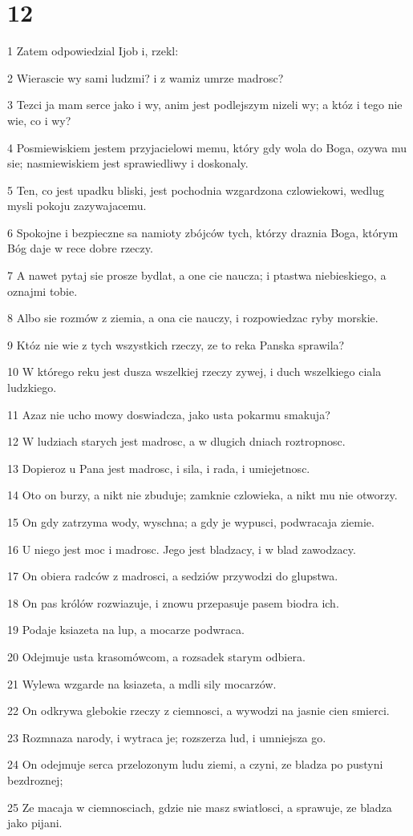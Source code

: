\chapter{12}

\par 1 Zatem odpowiedzial Ijob i, rzekl:
\par 2 Wierascie wy sami ludzmi? i z wamiz umrze madrosc?
\par 3 Tezci ja mam serce jako i wy, anim jest podlejszym nizeli wy; a któz i tego nie wie, co i wy?
\par 4 Posmiewiskiem jestem przyjacielowi memu, który gdy wola do Boga, ozywa mu sie; nasmiewiskiem jest sprawiedliwy i doskonaly.
\par 5 Ten, co jest upadku bliski, jest pochodnia wzgardzona czlowiekowi, wedlug mysli pokoju zazywajacemu.
\par 6 Spokojne i bezpieczne sa namioty zbójców tych, którzy draznia Boga, którym Bóg daje w rece dobre rzeczy.
\par 7 A nawet pytaj sie prosze bydlat, a one cie naucza; i ptastwa niebieskiego, a oznajmi tobie.
\par 8 Albo sie rozmów z ziemia, a ona cie nauczy, i rozpowiedzac ryby morskie.
\par 9 Któz nie wie z tych wszystkich rzeczy, ze to reka Panska sprawila?
\par 10 W którego reku jest dusza wszelkiej rzeczy zywej, i duch wszelkiego ciala ludzkiego.
\par 11 Azaz nie ucho mowy doswiadcza, jako usta pokarmu smakuja?
\par 12 W ludziach starych jest madrosc, a w dlugich dniach roztropnosc.
\par 13 Dopieroz u Pana jest madrosc, i sila, i rada, i umiejetnosc.
\par 14 Oto on burzy, a nikt nie zbuduje; zamknie czlowieka, a nikt mu nie otworzy.
\par 15 On gdy zatrzyma wody, wyschna; a gdy je wypusci, podwracaja ziemie.
\par 16 U niego jest moc i madrosc. Jego jest bladzacy, i w blad zawodzacy.
\par 17 On obiera radców z madrosci, a sedziów przywodzi do glupstwa.
\par 18 On pas królów rozwiazuje, i znowu przepasuje pasem biodra ich.
\par 19 Podaje ksiazeta na lup, a mocarze podwraca.
\par 20 Odejmuje usta krasomówcom, a rozsadek starym odbiera.
\par 21 Wylewa wzgarde na ksiazeta, a mdli sily mocarzów.
\par 22 On odkrywa glebokie rzeczy z ciemnosci, a wywodzi na jasnie cien smierci.
\par 23 Rozmnaza narody, i wytraca je; rozszerza lud, i umniejsza go.
\par 24 On odejmuje serca przelozonym ludu ziemi, a czyni, ze bladza po pustyni bezdroznej;
\par 25 Ze macaja w ciemnosciach, gdzie nie masz swiatlosci, a sprawuje, ze bladza jako pijani.

